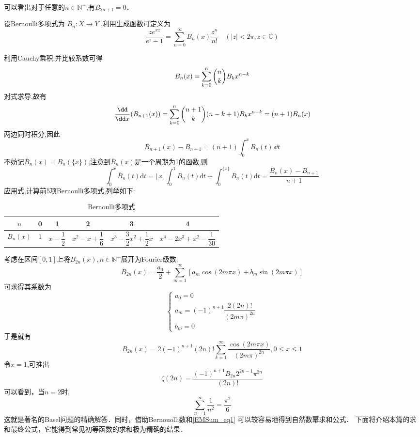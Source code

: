 可以看出对于任意的$n\in\mathbb N^+$,有$B_{2n+1}=0$．
\begin{definition}{}
设Bernoulli多项式为 $B_{n}:X\to Y$ ,利用生成函数可定义为
\begin{equation}{}
    \frac{ze^{xz}}{e^{z}-1}=\sum_{n=0}^{\infty}B_{n}(x)\frac{z^{n}}{n!}
    \quad(|z|<2\pi,z\in{\mathbb C})
\end{equation}	
\end{definition}
利用Cauchy乘积,并比较系数可得
\begin{equation}
    B_{n}(x)=\sum_{k=0}^{n}\dbinom{n}{k}B_{k}x^{n-k}
\end{equation}
对式求导,故有
\begin{equation}
    \frac{\dd}{\dd x}(B_{n+1}(x))=\sum_{k=0}^{n}\dbinom{n+1}{k}(n-k+1)B_{k}x^{n-k}=(n+1)B_{n}(x)
\end{equation}
两边同时积分,因此
\begin{equation}
    B_{n+1}(x)-B_{n+1}=(n+1)\int_{0}^{x}B_{n}(t)\,\dd t
\end{equation}
不妨记$\bar{B}_{n}(x)=B_{n}(\{x\})$,注意到$\bar{B}_{n}(x)$是一个周期为1的函数,则
\begin{equation}\label{EMSum_eq13}
    \int_{0}^{x}\bar{B}_{n}(t)\mathrm{d}t
    =\lfloor x\rfloor\int_{0}^{1}B_{n}(t)\mathrm{d}t+\int_{0}^{\{x\}}B_{n}(t)\mathrm{d}t
    =\frac{\bar{B}_{n}(x)-B_{n+1}}{n+1}
\end{equation}
应用式,计算前5项Bernoulli多项式,列举如下:
\begin{table}[ht]
\centering
\caption{Bernoulli多项式}
\begin{tabular}{|c|c|c|c|c|c|}
\hline
$n$ & 0 & 1 & 2 & 3 & 4\\
\hline
$B_{n}(x)$ & $1$ & $x-\dfrac{1}{2}$ & $x^{2}-x+\dfrac{1}{6}$ & $x^{3}-\dfrac{3}{2}x^{2}+\dfrac{1}{2}x$ & $x^{4}-2x^{3}+x^{2}-\dfrac{1}{30}$\\
\hline
\end{tabular}
\end{table}
考虑在区间$[0,1]$上将$B_{2n}(x),n\in{\mathbb N^{+}}$展开为Fourier级数:
\[
    B_{2n}(x)=\frac{a_{0}}{2}+\sum_{m=1}^{\infty}[a_{m}\cos(2m\pi x)+b_{m}\sin(2m\pi x)]
\]
可求得其系数为
\begin{equation}
\begin{cases}
    a_{0}=0\\
    a_{m}=(-1)^{n+1}\dfrac{2(2n)!}{(2m\pi)^{2n}}\\
    b_{m}=0
\end{cases}
\end{equation}
于是就有
\begin{equation}\label{EMSum_eq15}
    B_{2n}(x)=2(-1)^{n+1}(2n)!\sum_{k=1}^{\infty}\frac{\cos(2m\pi x)}{(2m\pi)^{2n}},0\leqslant x\leqslant1
\end{equation}
令$x=1$,可推出
\begin{equation}
    \zeta(2n)=\frac{(-1)^{n+1}B_{2n}2^{2n-1}\pi^{2n}}{(2n)!}
\end{equation}
可以看到，当$n=2$时,
\[
    \sum_{n=1}^{\infty}\frac{1}{n^2}=\frac{\pi^2}{6}
\]
这就是著名的Basel问题的精确解答．同时，借助Bernouolli数和\autoref{EMSum_eq1} 可以较容易地得到自然数幂求和公式．
下面将介绍本篇的求和最终公式，它能得到常见初等函数的求和极为精确的结果．

